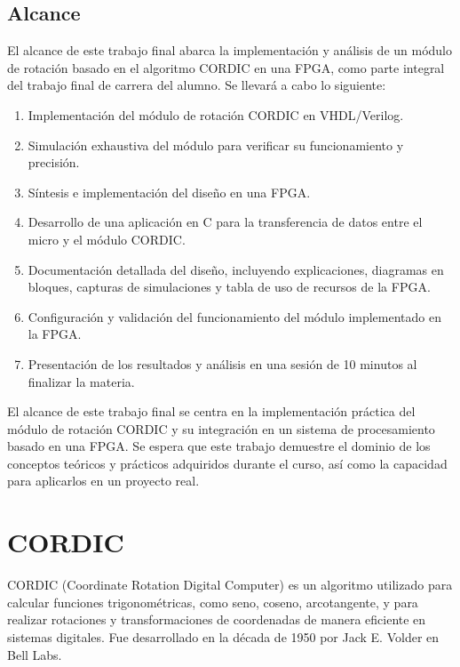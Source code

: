 \documentclass[12pt,a4paper, twoside]{article} %
\begin{document}
\subsection{Alcance}
\label{subsec:org12e44a2}

El alcance de este trabajo final abarca la implementación y análisis de un módulo de rotación basado en el algoritmo CORDIC en una FPGA, como parte integral del trabajo final de carrera del alumno. Se llevará a cabo lo siguiente:

\begin{enumerate}

    \item Implementación del módulo de rotación CORDIC en VHDL/Verilog.
    \item Simulación exhaustiva del módulo para verificar su funcionamiento y precisión.
    \item Síntesis e implementación del diseño en una FPGA.
    \item Desarrollo de una aplicación en C para la transferencia de datos entre el micro y el módulo CORDIC.
    \item Documentación detallada del diseño, incluyendo explicaciones, diagramas en bloques, capturas de simulaciones y tabla de uso de recursos de la FPGA.
    \item Configuración y validación del funcionamiento del módulo implementado en la FPGA.
    \item Presentación de los resultados y análisis en una sesión de 10 minutos al finalizar la materia.
\end{enumerate}


El alcance de este trabajo final se centra en la implementación práctica del módulo de rotación CORDIC y su integración en un sistema de procesamiento basado en una FPGA. Se espera que este trabajo demuestre el dominio de los conceptos teóricos y prácticos adquiridos durante el curso, así como la capacidad para aplicarlos en un proyecto real.

\newpage

\section{CORDIC}
\label{sec:orgc1c4017}

CORDIC (Coordinate Rotation Digital Computer) es un algoritmo utilizado para calcular funciones trigonométricas, como seno, coseno, arcotangente, y para realizar rotaciones y transformaciones de coordenadas de manera eficiente en sistemas digitales. Fue desarrollado en la década de 1950 por Jack E. Volder en Bell Labs.
\end{document}
